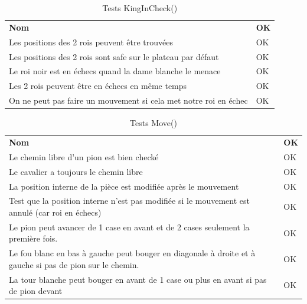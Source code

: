 \documentclass[12pt]{article}
\begin{document}
\begin{table}[h!]
\caption{Tests KingInCheck()}
\begin{tabular}{p{15cm}||p{2cm}}
\textbf{Nom}                                                     & \textbf{OK }\\
Les positions des 2 rois peuvent être trouvées                   & OK \\
Les positions des 2 rois sont safe sur le plateau par défaut     & OK \\
Le roi noir est en échecs quand la dame blanche le menace        & OK \\
Les 2 rois peuvent être en échecs en même temps                  & OK \\
On ne peut pas faire un mouvement si cela met notre roi en échec & OK
\end{tabular}
\end{table}

\begin{table}[]
\caption{Tests Move()}
\begin{tabular}{p{15cm}||p{2cm}}
\textbf{Nom}                                                                                             & \textbf{OK }\\
Le chemin libre d'un pion est bien checké                                                                & OK \\
Le cavalier a toujours le chemin libre                                                                   & OK \\
La position interne de la pièce est modifiée après le mouvement                                          & OK \\
Test que la position interne n'est pas modifiée si le mouvement est annulé (car roi en échecs)           & OK \\
Le pion peut avancer de 1 case en avant et de 2 cases seulement la première fois.                        & OK \\
Le fou blanc en bas à gauche peut bouger en diagonale à droite et à gauche si pas de pion sur le chemin. & OK \\
La tour blanche peut bouger en avant de 1 case ou plus en avant si pas de pion devant                    & OK
\end{tabular}
\end{table}
\end{document}
